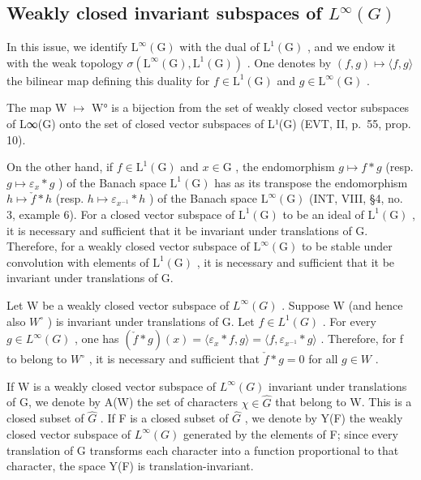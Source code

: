 \subsection{\texorpdfstring{Weakly closed invariant subspaces of \(L^{\infty}(G)\)}{Weakly closed invariant subspaces of L\^{}\{\textbackslash infinity\}(G)}}

In this issue, we identify \(\mathrm{L}^{\infty}(\mathrm{G})\) with the dual of \(\mathrm{L}^{1}(\mathrm{G})\) , and we endow it with the weak topology \(\sigma(\mathrm{L}^{\infty}(\mathrm{G}),\mathrm{L}^{1}(\mathrm{G}))\) . One denotes by \((f,g)\mapsto\langle f,g\rangle\) the bilinear map defining this duality for \(f\in\mathrm{L}^{1}(\mathrm{G})\) and \(g\in\mathrm{L}^{\infty}(\mathrm{G})\) .

The map W \(\mapsto\) W° is a bijection from the set of weakly closed vector subspaces of L∞(G) onto the set of closed vector subspaces of L¹(G) (EVT, II, p.~55, prop. 10).

On the other hand, if \(f \in \mathrm{L}^1(\mathrm{G})\) and \(x \in \mathrm{G}\) , the endomorphism \(g \mapsto f * g\) (resp. \(g \mapsto \varepsilon_x * g\) ) of the Banach space \(\mathrm{L}^1(\mathrm{G})\) has as its transpose the endomorphism \(h \mapsto \check{f} * h\) (resp. \(h \mapsto \varepsilon_{x^{-1}} * h\) ) of the Banach space \(\mathrm{L}^\infty(\mathrm{G})\) (INT, VIII, §4, no. 3, example 6). For a closed vector subspace of \(\mathrm{L}^1(\mathrm{G})\) to be an ideal of \(\mathrm{L}^1(\mathrm{G})\) , it is necessary and sufficient that it be invariant under translations of G. Therefore, for a weakly closed vector subspace of \(\mathrm{L}^\infty(\mathrm{G})\) to be stable under convolution with elements of \(\mathrm{L}^1(\mathrm{G})\) , it is necessary and sufficient that it be invariant under translations of G.

Let W be a weakly closed vector subspace of \(L^{\infty}(G)\) . Suppose W (and hence also \(W^{\circ}\) ) is invariant under translations of G. Let \(f \in L^{1}(G)\) . For every \(g \in L^{\infty}(G)\) , one has \((\check{f} * g)(x) = \langle \varepsilon_{x} * f, g \rangle = \langle f, \varepsilon_{x^{-1}} * g \rangle\) . Therefore, for f to belong to \(W^{\circ}\) , it is necessary and sufficient that \(\check{f} * g = 0\) for all \(g \in W\) .

If W is a weakly closed vector subspace of \(L^{\infty}(G)\) invariant under translations of G, we denote by A(W) the set of characters \(\chi \in \widehat{G}\) that belong to W. This is a closed subset of \(\widehat{G}\) . If F is a closed subset of \(\widehat{G}\) , we denote by Y(F) the weakly closed vector subspace of \(L^{\infty}(G)\) generated by the elements of F; since every translation of G transforms each character into a function proportional to that character, the space Y(F) is translation-invariant.

